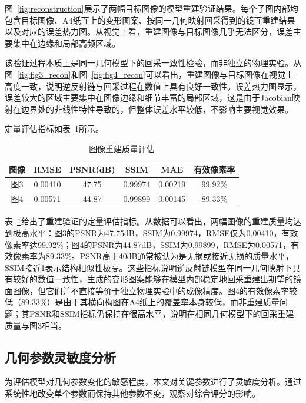 \documentclass[withoutpreface]{cumcmthesis}
\begin{document}
图~\ref{fig:reconstruction}展示了两幅目标图像的模型重建验证结果。每个子图内部均包含目标图像、A4纸面上的变形图案、按同一几何映射回采得到的镜面重建结果以及对应的误差热力图。从视觉上看，重建图像与目标图像几乎无法区分，误差主要集中在边缘和局部高频区域。

该验证过程本质上是同一几何模型下的回采一致性检验，而非独立的物理实验。从图~\ref{fig:fig3_recon}和图~\ref{fig:fig4_recon}可以看出，重建图像与目标图像在视觉上高度一致，说明逆反射链与回采过程在数值上具有良好一致性。误差热力图显示，误差较大的区域主要集中在图像边缘和细节丰富的局部区域，这是由于Jacobian映射在边界处的非线性特性导致的，但整体误差水平较低，不影响主要视觉效果。

定量评估指标如表~\ref{tab:validation}所示。

\begin{table}[H]
\centering
\caption{图像重建质量评估}
\label{tab:validation}
\begin{tabular}{cccccc}
\toprule[1.5pt]
\textbf{图像} & \textbf{RMSE} & \textbf{PSNR(dB)} & \textbf{SSIM} & \textbf{MAE} & \textbf{有效像素率} \\
\midrule[1pt]
图3 & 0.00410 & 47.75 & 0.99974 & 0.00219 & 99.92\% \\
图4 & 0.00571 & 44.87 & 0.99899 & 0.00145 & 89.33\% \\
\bottomrule[1.5pt]
\end{tabular}
\end{table}

表~\ref{tab:validation}给出了重建验证的定量评估指标。从数据可以看出，两幅图像的重建质量均达到极高水平：图3的PSNR为47.75dB，SSIM为0.99974，RMSE仅为0.00410，有效像素率达99.92\%；图4的PSNR为44.87dB，SSIM为0.99899，RMSE为0.00571，有效像素率为89.33\%。PSNR高于40dB通常被认为是无损或接近无损的质量水平，SSIM接近1表示结构相似性极高。这些指标说明逆反射链模型在同一几何映射下具有较好的数值一致性，生成的变形图案能够在模型内部稳定地回采重建出期望的镜面图像，但它们并不直接等价于独立物理实验中的成像精度。图4的有效像素率较低（89.33\%）是由于其横向构图在A4纸上的覆盖率本身较低，而非重建质量问题；其PSNR和SSIM指标仍保持在很高水平，说明在相同几何模型下的回采重建质量与图3相当。

\subsection{几何参数灵敏度分析}

为评估模型对几何参数变化的敏感程度，本文对关键参数进行了灵敏度分析。通过系统性地改变单个参数而保持其他参数不变，观察对综合评分的影响。
\end{document}
